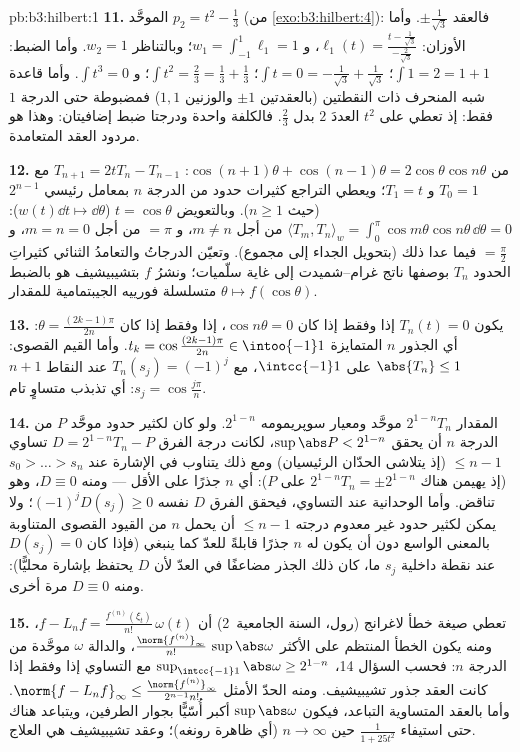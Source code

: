 \begin{solution}{pb:b3:hilbert:1}
\textbf{11.} الموحَّد $p_2 = t^2 - \frac13$ (من \cref{exo:b3:hilbert:4}): فالعقد $\pm\frac1{\sqrt3}$.
وأما الأوزان: $\ell_1(t) = \frac{t - \frac1{\sqrt3}}{-\frac2{\sqrt3}}$، و $w_1 = \int_{-1}^1\ell_1 = 1$؛ وبالتناظر $w_2 = 1$. وأما
الضبط: $\int 1 = 2 = 1 + 1$؛ $\int t = 0 =
-\frac1{\sqrt3} + \frac1{\sqrt3}$؛ $\int t^2 = \frac23 =
\frac13 + \frac13$؛ و $\int t^3 = 0$. وأما قاعدة
شبه المنحرف ذات النقطتين (بالعقدتين $\pm1$ والوزنين $1, 1$)
فمضبوطة حتى الدرجة $1$ فقط: إذ تعطي على $t^2$ العددَ $2$ بدل
$\frac23$. فالكلفة واحدة ودرجتا ضبط إضافيتان: وهذا هو مردود
العقد المتعامدة.

\textbf{12.} من $\cos(n{+}1)\theta + \cos(n{-}1)\theta =
2\cos\theta\cos n\theta$: $T_{n+1} = 2tT_n - T_{n-1}$ مع $T_0 = 1$ و $T_1 = t$؛
ويعطي التراجع كثيرات حدود من الدرجة $n$ بمعامل رئيسي $2^{n-1}$
(حيث $n \geq 1$). وبالتعويض $t = \cos\theta$ ($w(t)\dd t \mapsto
\dd\theta$):
$\langle T_m, T_n\rangle_w =
\int_0^\pi\cos m\theta\cos n\theta\,\dd\theta = 0$ من أجل $m
\neq n$، و $= \pi$ من أجل $m = n = 0$، و
$= \frac\pi2$ فيما عدا ذلك (بتحويل الجداء إلى مجموع). وتعيّن
الدرجاتُ والتعامدُ الثنائي كثيراتِ الحدود $T_n$ بوصفها ناتج
غرام--شميدت إلى غاية سلّميات؛ ونشرُ $f$ بتشيبيشيف هو بالضبط
متسلسلة فورييه الجيبتمامية للمقدار $\theta \mapsto f(\cos\theta)$.

\textbf{13.} يكون $T_n(t) = 0$ إذا وفقط إذا كان $\cos n\theta = 0$، إذا
وفقط إذا كان $\theta = \frac{(2k-1)\pi}{2n}$: أي الجذور $n$ المتمايزة $t_k = \cos\frac{(2k-1)\pi}{2n} \in \intoo{-1}1$. وأما
القيم القصوى: $\abs{T_n} \leq 1$ على $\intcc{-1}1$، مع $T_n(s_j) =
(-1)^j$ عند النقاط
$n + 1$ $s_j = \cos\frac{j\pi}n$: أي تذبذب متساوٍ تام.

\textbf{14.} المقدار $2^{1-n}T_n$ موحَّد ومعيار سوپريمومه
$2^{1-n}$. ولو كان لكثير حدود موحَّد $P$ من الدرجة $n$ أن يحقق
$\sup\abs P < 2^{1-n}$، لكانت درجة الفرق $D = 2^{1-n}T_n - P$ تساوي $\leq n -
1$ (إذ يتلاشى
الحدّان الرئيسيان) ومع ذلك يتناوب في الإشارة عند $s_0 >
\dots > s_n$ (إذ
يهيمن هناك $2^{1-n}T_n = \pm2^{1-n}$ على $P$): أي $n$ جذرًا على الأقل --- ومنه
$D \equiv 0$، وهو تناقض. وأما الوحدانية عند التساوي، فيحقق
الفرق $D$ نفسه $(-1)^jD(s_j) \geq 0$؛ ولا يمكن لكثير حدود غير معدوم درجته
$\leq
n-1$ أن يحمل $n$ من القيود القصوى المتناوبة بالمعنى الواسع
دون أن يكون له $n$ جذرًا قابلةً للعدّ كما ينبغي (فإذا كان
$D(s_j) = 0$ عند نقطة داخلية $s_j$ ما، كان ذلك الجذر مضاعفًا في
العدّ لأن $D$ يحتفظ بإشارة محليًّا): ومنه $D
\equiv 0$ مرة أخرى.

\textbf{15.} تعطي صيغة خطأ لاغرانج (رول، السنة الجامعية~2)
أن $f - L_nf = \frac{f^{(n)}(\xi_t)}{n!}\,\omega(t)$، ومنه يكون الخطأ المنتظم على الأكثر $\frac{\norm{f^{(n)}}_\infty}
{n!}\,\sup\abs\omega$، والدالة
$\omega$ موحَّدة من الدرجة $n$: فحسب السؤال 14، $\sup_{\intcc{-1}1}\abs\omega \geq 2^{1-n}$ مع
التساوي إذا وفقط إذا كانت العقد جذور تشيبيشيف. ومنه الحدّ
الأمثل $\norm{f - L_nf}_\infty \leq
\frac{\norm{f^{(n)}}_\infty}{2^{n-1}n!}$. وأما بالعقد المتساوية التباعد، فيكون
$\sup\abs\omega$ أكبر أُسّيًّا بجوار الطرفين، ويتباعد هناك حتى
استيفاء $\frac1{1 + 25t^2}$ حين $n \to \infty$ (أي ظاهرة رونغه)؛ وعقد
تشيبيشيف هي العلاج.


\end{solution}
